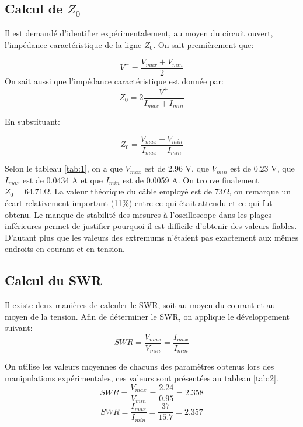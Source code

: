\subsection{Calcul de $Z_0$}
Il est demandé d'identifier expérimentalement, au moyen du circuit ouvert, l'impédance caractéristique de la ligne $Z_0$. On sait premièrement que:

\begin{equation}
V^+ = \frac{V_{max} + V_{min}}{2}
\end{equation}
On sait aussi que l'impédance caractéristique est donnée par:
\begin{equation}
Z_0 = 2\frac{V^+}{I_{max} + I_{min}}
\end{equation}

En substituant:

\begin{equation}
Z_0 = \frac{V_{max} + V_{min}}{I_{max} + I_{min}}
\end{equation}


Selon le tableau \ref{tab:1}, on a que $V_{max}$ est de 2.96 V, que $V_{min}$ est de 0.23 V, que $I_{max}$ est de 0.0434 A et que $I_{min}$ est de 0.0059 A. On trouve finalement $Z_0 = 64.71 \Omega $. La valeur théorique du câble employé est de $73\Omega$, on remarque un écart relativement important  (11\%) entre ce qui était attendu et ce qui fut obtenu. Le manque de stabilité des mesures à l'oscilloscope dans les plages inférieures permet de justifier pourquoi il est difficile d'obtenir des valeurs fiables. D'autant plus que les valeurs des extremums n'étaient pas exactement aux mêmes endroits en courant et en tension.

\subsection{Calcul du SWR}
Il existe deux manières de calculer le SWR, soit au moyen du courant et au moyen de la tension. Afin de déterminer le SWR, on applique le développement suivant:
\begin{equation}
SWR = \frac{V_{max}}{V_{min}} = \frac{I_{max}}{I_{min}}
\end{equation}

On utilise les valeurs moyennes de chacuns des paramètres obtenus lors des manipulations expérimentales, ces valeurs sont présentées au tableau \ref{tab:2}.
\begin{equation}
SWR = \frac{V_{max}}{V_{min}} = \frac{2.24}{0.95} = 2.358
\end{equation}
\begin{equation}
SWR = \frac{I_{max}}{I_{min}} = \frac{37}{15.7} = 2.357
\end{equation}

